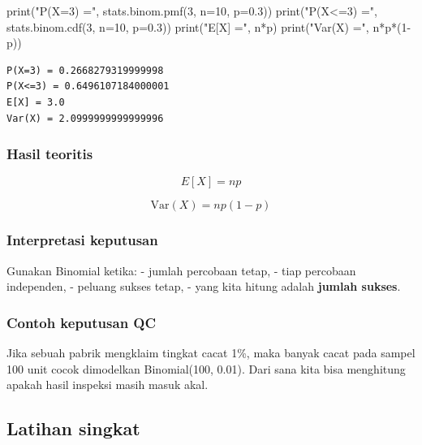 \documentclass[
  letterpaper,
  DIV=11,
  numbers=noendperiod]{scrreprt}
\newenvironment{Shaded}{\begin{snugshade}}{\end{snugshade}}
\newcommand{\BuiltInTok}[1]{\textcolor[rgb]{0.00,0.23,0.31}{#1}}
\newcommand{\DecValTok}[1]{\textcolor[rgb]{0.68,0.00,0.00}{#1}}
\newcommand{\FloatTok}[1]{\textcolor[rgb]{0.68,0.00,0.00}{#1}}
\newcommand{\NormalTok}[1]{\textcolor[rgb]{0.00,0.23,0.31}{#1}}
\newcommand{\OperatorTok}[1]{\textcolor[rgb]{0.37,0.37,0.37}{#1}}
\newcommand{\StringTok}[1]{\textcolor[rgb]{0.13,0.47,0.30}{#1}}
\begin{document}
\begin{Shaded}
\begin{Highlighting}[]
\BuiltInTok{print}\NormalTok{(}\StringTok{"P(X=3) ="}\NormalTok{, stats.binom.pmf(}\DecValTok{3}\NormalTok{, n}\OperatorTok{=}\DecValTok{10}\NormalTok{, p}\OperatorTok{=}\FloatTok{0.3}\NormalTok{))}
\BuiltInTok{print}\NormalTok{(}\StringTok{"P(X\textless{}=3) ="}\NormalTok{, stats.binom.cdf(}\DecValTok{3}\NormalTok{, n}\OperatorTok{=}\DecValTok{10}\NormalTok{, p}\OperatorTok{=}\FloatTok{0.3}\NormalTok{))}
\BuiltInTok{print}\NormalTok{(}\StringTok{"E[X] ="}\NormalTok{, n}\OperatorTok{*}\NormalTok{p)}
\BuiltInTok{print}\NormalTok{(}\StringTok{"Var(X) ="}\NormalTok{, n}\OperatorTok{*}\NormalTok{p}\OperatorTok{*}\NormalTok{(}\DecValTok{1}\OperatorTok{{-}}\NormalTok{p))}
\end{Highlighting}
\end{Shaded}

\begin{verbatim}
P(X=3) = 0.2668279319999998
P(X<=3) = 0.6496107184000001
E[X] = 3.0
Var(X) = 2.0999999999999996
\end{verbatim}

\subsubsection{Hasil teoritis}\label{hasil-teoritis-2}

\[
E[X]=np
\]

\[
\mathrm{Var}(X)=np(1-p)
\]

\subsubsection{Interpretasi keputusan}\label{interpretasi-keputusan-4}

Gunakan Binomial ketika: - jumlah percobaan tetap, - tiap percobaan
independen, - peluang sukses tetap, - yang kita hitung adalah
\textbf{jumlah sukses}.

\subsubsection{Contoh keputusan QC}\label{contoh-keputusan-qc}

Jika sebuah pabrik mengklaim tingkat cacat 1\%, maka banyak cacat pada
sampel 100 unit cocok dimodelkan Binomial(100, 0.01). Dari sana kita
bisa menghitung apakah hasil inspeksi masih masuk akal.

\subsection{Latihan singkat}\label{latihan-singkat-8}
\end{document}
